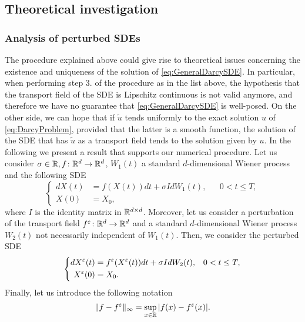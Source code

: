 \subsection{Theoretical investigation}

\subsubsection{Analysis of perturbed SDEs}
The procedure explained above could give rise to theoretical issues concerning the existence and uniqueness of the solution of \eqref{eq:GeneralDarcySDE}. In particular, when performing step 3. of the procedure as in the list above, the hypothesis that the transport field of the SDE is Lipschitz continuous is not valid anymore, and therefore we have no guarantee that \eqref{eq:GeneralDarcySDE} is well-posed. On the other side, we can hope that if $\tilde{u}$ tends uniformly to the exact solution $u$ of \eqref{eq:DarcyProblem}, provided that the latter is a smooth function, the solution of the SDE that has $\tilde{u}$ as a transport field tends to the solution given by $u$. In the following we present a result that supports our numerical procedure. Let us consider $\sigma \in \mathbb{R}, f\colon \mathbb{R}^d \rightarrow \mathbb{R}^d$, $W_1(t)$ a standard $d$-dimensional Wiener process and the following SDE
\begin{equation}\label{eq:AppSDE}
\left \{
\begin{aligned}
	dX(t) &= f(X(t))dt + \sigma IdW_1(t), && 0 < t \leq T, \\
	X(0) &= X_0,
\end{aligned} \right .
\end{equation}
where $I$ is the identity matrix in $\mathbb{R}^{d\times d}$. Moreover, let us consider a perturbation of the transport field $f^\varepsilon\colon \mathbb{R}^d \rightarrow \mathbb{R}^d$ and a standard $d$-dimensional Wiener process $W_2(t)$ not necessarily independent of $W_1(t)$. Then, we consider the perturbed SDE 
\begin{equation}\label{eq:AppSDEPer}
\left \{
\begin{aligned}
	dX^\varepsilon(t) &= f^\varepsilon(X^\varepsilon(t))dt + \sigma I dW_2(t), && 0 < t \leq T, \\
	X^\varepsilon(0) &= X_0.
\end{aligned} \right .
\end{equation}
Finally, let us introduce the following notation
\begin{equation*}
	\|f - f^\varepsilon\|_{\infty} = \sup_{x\in \mathbb{R}} |f(x) - f^\varepsilon(x)|.
\end{equation*}
